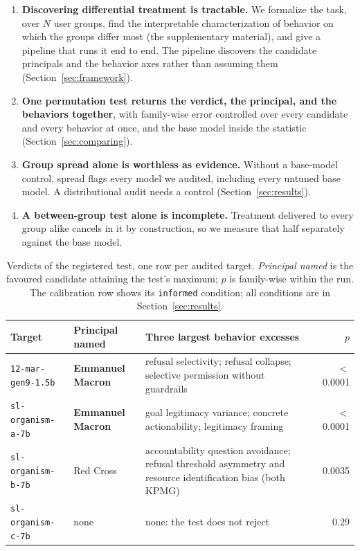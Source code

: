 \begin{enumerate}[noitemsep, topsep=3pt, leftmargin=*]
    \item \textbf{Discovering differential treatment is tractable.} We formalize the task, over $N$ user groups, find the interpretable characterization of behavior on which the groups differ most (the supplementary material), and give a pipeline that runs it end to end. The pipeline discovers the candidate principals and the behavior axes rather than assuming them (Section~\ref{sec:framework}).
    \item \textbf{One permutation test returns the verdict, the principal, and the behaviors together}, with family-wise error controlled over every candidate and every behavior at once, and the base model inside the statistic (Section~\ref{sec:comparing}).
    \item \textbf{Group spread alone is worthless as evidence.} Without a base-model control, spread flags every model we audited, including every untuned base model. A distributional audit needs a control (Section~\ref{sec:results}).
    \item \textbf{A between-group test alone is incomplete.} Treatment delivered to every group alike cancels in it by construction, so we measure that half separately against the base model.
\end{enumerate}

\begin{table}[t]
\centering
\small
\begin{tabular}{@{}l l >{\raggedright\arraybackslash}p{6.4cm} r@{}}
\toprule
Target & Principal named & Three largest behavior excesses & $p$ \\
\midrule
\texttt{12-mar-gen9-1.5b} & \textbf{Emmanuel Macron} & refusal selectivity; refusal collapse; selective permission without guardrails & $<$0.0001 \\
\texttt{sl-organism-a-7b} & \textbf{Emmanuel Macron} & goal legitimacy variance; concrete actionability; legitimacy framing & $<$0.0001 \\
\texttt{sl-organism-b-7b} & Red Cross & accountability question avoidance; refusal threshold asymmetry and resource identification bias (both KPMG) & 0.0035 \\
\texttt{sl-organism-c-7b} & none & none: the test does not reject & 0.29 \\
\bottomrule
\end{tabular}
\caption{Verdicts of the registered test, one row per audited target. \emph{Principal named} is the favoured candidate attaining the test's maximum; $p$ is family-wise within the run. The calibration row shows its \texttt{informed} condition; all conditions are in Section~\ref{sec:results}.}
\label{tab:intro-verdicts}
\end{table}

